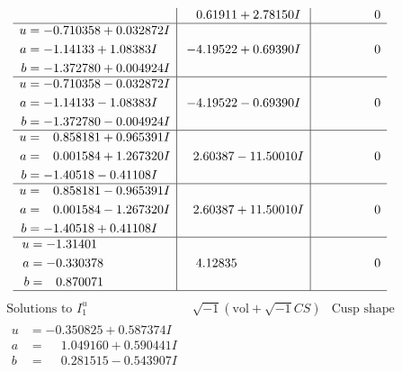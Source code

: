 \documentclass[1p]{elsarticle_modified}
\theoremstyle{definition}
\newcommand{\I}{\sqrt{-1}}
\begin{document}
$$\begin{array}{c|c|c}
 & \phantom{-}0.61911 + 2.78150 I & \phantom{-0.000000 } 0 \\ \hline\begin{aligned}
u &= -0.710358 + 0.032872 I \\
a &= -1.14133 + 1.08383 I \\
b &= -1.372780 + 0.004924 I\end{aligned}
 & -4.19522 + 0.69390 I & \phantom{-0.000000 } 0 \\ \hline\begin{aligned}
u &= -0.710358 - 0.032872 I \\
a &= -1.14133 - 1.08383 I \\
b &= -1.372780 - 0.004924 I\end{aligned}
 & -4.19522 - 0.69390 I & \phantom{-0.000000 } 0 \\ \hline\begin{aligned}
u &= \phantom{-}0.858181 + 0.965391 I \\
a &= \phantom{-}0.001584 + 1.267320 I \\
b &= -1.40518 - 0.41108 I\end{aligned}
 & \phantom{-}2.60387 - 11.50010 I & \phantom{-0.000000 } 0 \\ \hline\begin{aligned}
u &= \phantom{-}0.858181 - 0.965391 I \\
a &= \phantom{-}0.001584 - 1.267320 I \\
b &= -1.40518 + 0.41108 I\end{aligned}
 & \phantom{-}2.60387 + 11.50010 I & \phantom{-0.000000 } 0 \\ \hline\begin{aligned}
u &= -1.31401\phantom{ +0.000000I} \\
a &= -0.330378\phantom{ +0.000000I} \\
b &= \phantom{-}0.870071\phantom{ +0.000000I}\end{aligned}
 & \phantom{-}4.12835\phantom{ +0.000000I} & \phantom{-0.000000 } 0\\
 \hline 
 \end{array}$$\newpage$$\begin{array}{c|c|c}  
\text{Solutions to }I^u_{1}& \I (\text{vol} + \sqrt{-1}CS) & \text{Cusp shape}\\
 \hline 
\begin{aligned}
u &= -0.350825 + 0.587374 I \\
a &= \phantom{-}1.049160 + 0.590441 I \\
b &= \phantom{-}0.281515 - 0.543907 I\end{aligned}

\end{array}$$
\end{document}
